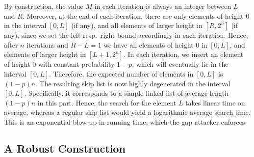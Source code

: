 By construction, the value $M$ in each iteration is always an integer between $L$ and $R$. Moreover, at the end of each iteration, there are only elements of height $0$ in the interval $[0,L]$ (if any), and all elements of larger height in $[R,2^{n}]$ (if any), since we set the left resp.~right bound accordingly in each iteration. 
Hence, after $n$ iterations and $R-L=1$ we have all elements of height $0$ in $[0,L]$, and elements of larger height in $[L+1,2^{n}]$. 
In each iteration, we insert an element of height $0$ with constant probability $1-p$, which will eventually lie in the interval $[0,L]$. Therefore, the expected number of elements in $[0,L]$ is $(1-p)n$.
%
The resulting skip list is now highly degenerated in the interval $[0,L]$. Specifically, it corresponds to a simple linked list of average length $(1-p)n$ in this part. Hence, the search for the element $L$ takes linear time on average, whereas a regular skip list would yield a logarithmic average search time. This is an exponential blow-up in running time, which the gap attacker enforces.

\subsection{A Robust Construction}

